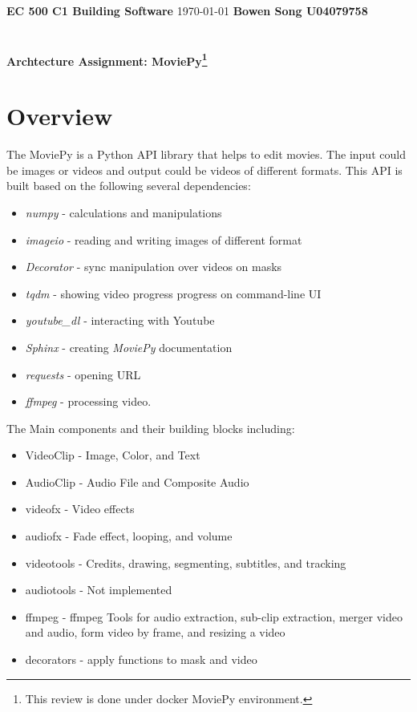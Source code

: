 \documentclass[a4paper, 11pt]{article}
\begin{document}
\large\textbf{EC 500 C1 Building Software}
\hfill
\today
\hfill
\textbf{Bowen Song U04079758}

{\section*{}}
\begin{title}
	\centering
    \vspace*{0.5cm}

    \huge\bfseries
    \centering Archtecture Assignment: MoviePy\footnote{This review is done under docker MoviePy environment.}

    \vspace*{0.5cm}
\end{title}
\noindent

\section{Overview}

The MoviePy is a Python API library that helps to edit movies. The input could be images or videos and output could be videos of different formats. This API is built based on the following several dependencies:
\begin{itemize}
	\item \textit{numpy} - calculations and manipulations
	\item \textit{imageio} - reading and writing images of different format
	\item \textit{Decorator} - sync manipulation over videos on masks
	\item \textit{tqdm} - showing video progress progress on command-line UI
	\item \textit{youtube\_dl} - interacting with Youtube
	\item \textit{Sphinx} - creating \textit{MoviePy} documentation
	\item \textit{requests} - opening URL
	\item \textit{ffmpeg} - processing video. 
\end{itemize}

The Main components and their building blocks including:
\begin{itemize}
   \item VideoClip - Image, Color, and Text
   \item AudioClip - Audio File and Composite Audio
   \item videofx - Video effects
   \item audiofx - Fade effect, looping, and volume
   \item videotools - Credits, drawing, segmenting, subtitles, and tracking
   \item audiotools - Not implemented
   \item ffmpeg - ffmpeg Tools for audio extraction, sub-clip extraction, merger video and audio, form video by frame, and resizing a video
   \item decorators - apply functions to mask and video
\end{itemize}
\end{document}
